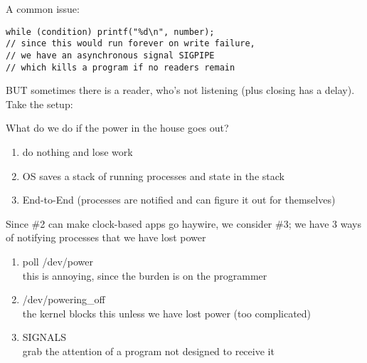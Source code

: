 \documentclass[../../lecture_notes.tex]{subfiles}
\begin{document}
A common issue:
\begin{lstlisting}
while (condition) printf("%d\n", number);
// since this would run forever on write failure, 
// we have an asynchronous signal SIGPIPE 
// which kills a program if no readers remain
\end{lstlisting}

BUT sometimes there is a reader, who's not listening (plus closing has a delay).
Take the setup:

\begin{center}
\end{center}


What do we do if the power in the house goes out?
\begin{enumerate}[nosep]
\item do nothing and lose work
\item OS saves a stack of running processes and state in the stack
\item End-to-End (processes are notified and can figure it out for themselves)
\end{enumerate}

Since \#2 can make clock-based apps go haywire, we consider \#3; we have 3 ways of notifying processes that we have lost power
\begin{enumerate}
\item poll /dev/power \\
	this is annoying, since the burden is on the programmer
\item /dev/powering\_off \\
	the kernel blocks this unless we have lost power (too complicated)
\item SIGNALS \\
	grab the attention of a program not designed to receive it
\end{enumerate}
\end{document}
